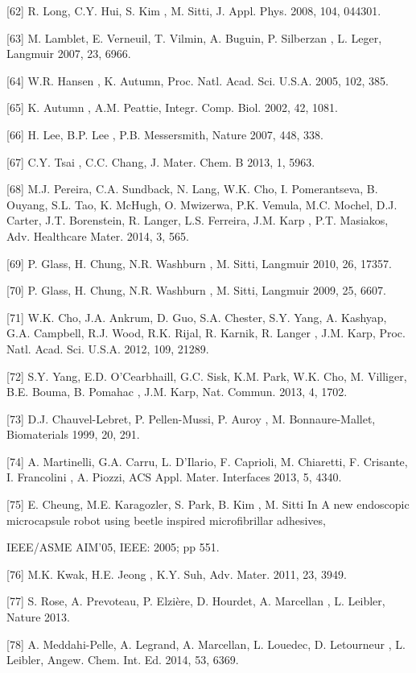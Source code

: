 [62]	R. Long, C.Y. Hui, S. Kim , M. Sitti, J. Appl. Phys. 2008, 104, 044301.

[63]	M. Lamblet, E. Verneuil, T. Vilmin, A. Buguin, P. Silberzan , L. Leger, Langmuir 2007, 23, 6966.

[64]	W.R. Hansen , K. Autumn, Proc. Natl. Acad. Sci. U.S.A. 2005, 102, 385.

[65]	K. Autumn , A.M. Peattie, Integr. Comp. Biol. 2002, 42, 1081.

[66]	H. Lee, B.P. Lee , P.B. Messersmith, Nature 2007, 448, 338.

[67]	C.Y. Tsai , C.C. Chang, J. Mater. Chem. B 2013, 1, 5963.

[68]	M.J. Pereira, C.A. Sundback, N. Lang, W.K. Cho, I. Pomerantseva, B. Ouyang, S.L. Tao, K. McHugh, O. Mwizerwa, P.K. Vemula, M.C. Mochel, D.J. 
Carter, J.T. Borenstein, R. Langer, L.S. Ferreira, J.M. Karp , P.T. Masiakos, Adv. Healthcare Mater. 2014, 3, 565.

[69]	P. Glass, H. Chung, N.R. Washburn , M. Sitti, Langmuir 2010, 26, 17357.

[70]	P. Glass, H. Chung, N.R. Washburn , M. Sitti, Langmuir 2009, 25, 6607.

[71]	W.K. Cho, J.A. Ankrum, D. Guo, S.A. Chester, S.Y. Yang, A. Kashyap, G.A. Campbell, R.J. Wood, R.K. Rijal, R. Karnik, R. Langer , J.M. Karp, Proc. 
Natl. Acad. Sci. U.S.A. 2012, 109, 21289.

[72]	S.Y. Yang, E.D. O'Cearbhaill, G.C. Sisk, K.M. Park, W.K. Cho, M. Villiger, B.E. Bouma, B. Pomahac , J.M. Karp, Nat. Commun. 2013, 4, 1702.

[73]	D.J. Chauvel-Lebret, P. Pellen-Mussi, P. Auroy , M. Bonnaure-Mallet, Biomaterials 1999, 20, 291.

[74]	A. Martinelli, G.A. Carru, L. D'Ilario, F. Caprioli, M. Chiaretti, F. Crisante, I. Francolini , A. Piozzi, ACS Appl. Mater. Interfaces 2013, 5, 
4340.

[75]	E. Cheung, M.E. Karagozler, S. Park, B. Kim , M. Sitti In A new endoscopic microcapsule robot using beetle inspired microfibrillar adhesives, 

IEEE/ASME AIM'05, IEEE: 2005; pp 551.

[76]	M.K. Kwak, H.E. Jeong , K.Y. Suh, Adv. Mater. 2011, 23, 3949.

[77]	S. Rose, A. Prevoteau, P. Elzière, D. Hourdet, A. Marcellan , L. Leibler, Nature 2013.

[78]	A. Meddahi-Pelle, A. Legrand, A. Marcellan, L. Louedec, D. Letourneur , L. Leibler, Angew. Chem. Int. Ed. 2014, 53, 6369.

